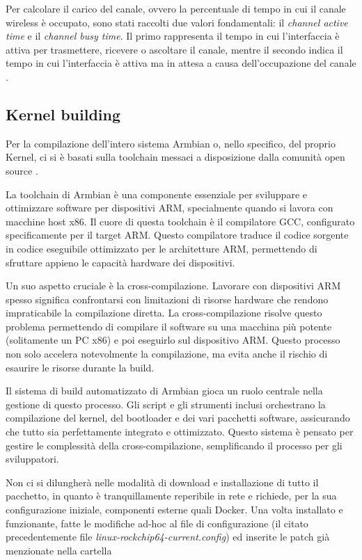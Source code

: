 Per calcolare il carico del canale, ovvero la percentuale di tempo in cui il canale wireless è occupato, sono stati raccolti due valori fondamentali: il \textit{channel active time} e il \textit{channel busy time}. Il primo rappresenta il tempo in cui l'interfaccia è attiva per trasmettere, ricevere o ascoltare il canale, mentre il secondo indica il tempo in cui l'interfaccia è attiva ma in attesa a causa dell'occupazione del canale \cite{han2016adaptive}.

\subsection[Kernel building]{Kernel building}
Per la compilazione dell'intero sistema Armbian o, nello specifico, del proprio Kernel, ci si è basati sulla toolchain messaci a disposizione dalla comunità open source \cite{armbian_tool}. 

La toolchain di Armbian è una componente essenziale per sviluppare e ottimizzare software per dispositivi ARM, specialmente quando si lavora con macchine host x86. Il cuore di questa toolchain è il compilatore GCC, configurato specificamente per il target ARM. Questo compilatore traduce il codice sorgente in codice eseguibile ottimizzato per le architetture ARM, permettendo di sfruttare appieno le capacità hardware dei dispositivi.

Un suo aspetto cruciale è la cross-compilazione. Lavorare con dispositivi ARM spesso significa confrontarsi con limitazioni di risorse hardware che rendono impraticabile la compilazione diretta. La cross-compilazione risolve questo problema permettendo di compilare il software su una macchina più potente (solitamente un PC x86) e poi eseguirlo sul dispositivo ARM. Questo processo non solo accelera notevolmente la compilazione, ma evita anche il rischio di esaurire le risorse durante la build.

Il sistema di build automatizzato di Armbian gioca un ruolo centrale nella gestione di questo processo. Gli script e gli strumenti inclusi orchestrano la compilazione del kernel, del bootloader e dei vari pacchetti software, assicurando che tutto sia perfettamente integrato e ottimizzato. Questo sistema è pensato per gestire le complessità della cross-compilazione, semplificando il processo per gli sviluppatori.

Non ci si dilungherà nelle modalità di download e installazione di tutto il pacchetto, in quanto è tranquillamente reperibile in rete e richiede, per la sua configurazione iniziale, componenti esterne quali Docker. Una volta installato e funzionante, fatte le modifiche ad-hoc al file di configurazione (il citato precedentemente file \textit{linux-rockchip64-current.config}) ed inserite le patch già menzionate nella cartella

